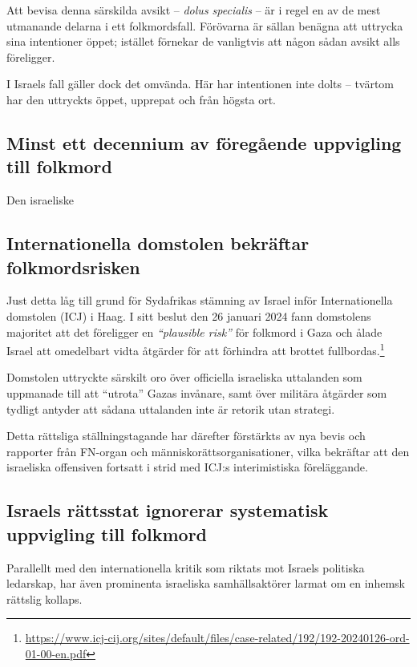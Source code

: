 Att bevisa denna särskilda avsikt – \textit{dolus specialis} – är i regel en av de mest utmanande delarna i ett folkmordsfall. Förövarna är sällan benägna att uttrycka sina intentioner öppet; istället förnekar de vanligtvis att någon sådan avsikt alls föreligger. 

I Israels fall gäller dock det omvända. Här har intentionen inte dolts – tvärtom har den uttryckts öppet, upprepat och från högsta ort.

\subsection{Minst ett decennium av föregående uppvigling till folkmord}
Den israeliske 


\subsection{Internationella domstolen bekräftar folkmordsrisken}

Just detta låg till grund för Sydafrikas stämning av Israel inför Internationella domstolen (ICJ) i Haag. I sitt beslut den 26 januari 2024 fann domstolens majoritet att det föreligger en \textit{“plausible risk”} för folkmord i Gaza och ålade Israel att omedelbart vidta åtgärder för att förhindra att brottet fullbordas.\footnote{\url{https://www.icj-cij.org/sites/default/files/case-related/192/192-20240126-ord-01-00-en.pdf}}

Domstolen uttryckte särskilt oro över officiella israeliska uttalanden som uppmanade till att “utrota” Gazas invånare, samt över militära åtgärder som tydligt antyder att sådana uttalanden inte är retorik utan strategi.

Detta rättsliga ställningstagande har därefter förstärkts av nya bevis och rapporter från FN-organ och människorättsorganisationer, vilka bekräftar att den israeliska offensiven fortsatt i strid med ICJ:s interimistiska föreläggande.

\subsection{Israels rättsstat ignorerar systematisk uppvigling till folkmord}

Parallellt med den internationella kritik som riktats mot Israels politiska ledarskap, har även prominenta israeliska samhällsaktörer larmat om en inhemsk rättslig kollaps.

